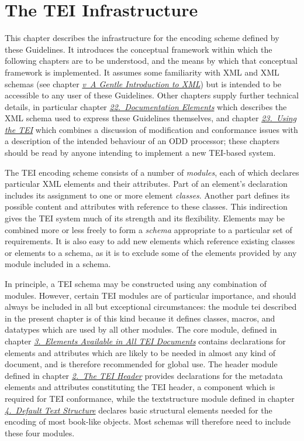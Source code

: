 
\section[{The TEI Infrastructure}]{The TEI Infrastructure}\label{ST}\par
This chapter describes the infrastructure for the encoding scheme defined by these Guidelines. It introduces the conceptual framework within which the following chapters are to be understood, and the means by which that conceptual framework is implemented. It assumes some familiarity with XML and XML schemas (see chapter \textit{\hyperref[SG]{v\ A Gentle Introduction to XML}}) but is intended to be accessible to any user of these Guidelines. Other chapters supply further technical details, in particular chapter \textit{\hyperref[TD]{22.\ Documentation Elements}} which describes the XML schema used to express these Guidelines themselves, and chapter \textit{\hyperref[USE]{23.\ Using the TEI}} which combines a discussion of modification and conformance issues with a description of the intended behaviour of an ODD processor; these chapters should be read by anyone intending to implement a new TEI-based system.\par
The TEI encoding scheme consists of a number of \textit{modules}, each of which declares particular XML elements and their attributes. Part of an element's declaration includes its assignment to one or more element \textit{classes}. Another part defines its possible content and attributes with reference to these classes. This indirection gives the TEI system much of its strength and its flexibility. Elements may be combined more or less freely to form a \textit{schema} appropriate to a particular set of requirements. It is also easy to add new elements which reference existing classes or elements to a schema, as it is to exclude some of the elements provided by any module included in a schema.\par
In principle, a TEI schema may be constructed using any combination of modules. However, certain TEI modules are of particular importance, and should always be included in all but exceptional circumstances: the module \textsf{tei} described in the present chapter is of this kind because it defines classes, macros, and datatypes which are used by all other modules. The \textsf{core} module, defined in chapter \textit{\hyperref[CO]{3.\ Elements Available in All TEI Documents}} contains declarations for elements and attributes which are likely to be needed in almost any kind of document, and is therefore recommended for global use. The \textsf{header} module defined in chapter \textit{\hyperref[HD]{2.\ The TEI Header}} provides declarations for the metadata elements and attributes constituting the TEI header, a component which is required for TEI conformance, while the \textsf{textstructure} module defined in chapter \textit{\hyperref[DS]{4.\ Default Text Structure}} declares basic structural elements needed for the encoding of most book-like objects. Most schemas will therefore need to include these four modules.\par
